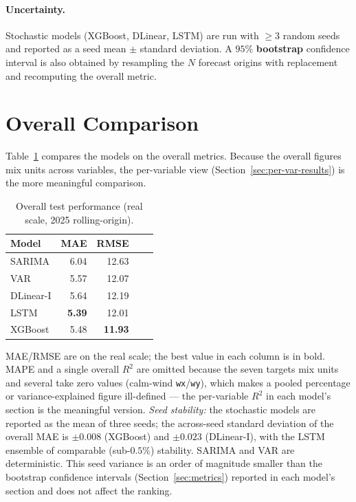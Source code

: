 \documentclass[12pt,a4paper,oneside]{report}
\begin{document}
\paragraph{Uncertainty.}
Stochastic models (XGBoost, DLinear, LSTM) are run with $\ge 3$ random seeds and
reported as a seed mean $\pm$ standard deviation. A $95\%$ \textbf{bootstrap}
confidence interval is also obtained by resampling the $N$ forecast origins with
replacement and recomputing the overall metric.

\section{Overall Comparison}
Table~\ref{tab:overall} compares the models on the overall metrics. Because the
overall figures mix units across variables, the per-variable view
(Section~\ref{sec:per-var-results}) is the more meaningful comparison.

\begin{table}[H]
\centering
\caption{Overall test performance (real scale, 2025 rolling-origin).}
\label{tab:overall}
\begin{tabular}{lrrrr}
\toprule
\textbf{Model} & \textbf{MAE} & \textbf{RMSE} \\
\midrule
SARIMA      & 6.04 & 12.63 \\
VAR         & 5.57 & 12.07 \\
DLinear-I   & 5.64 & 12.19 \\
LSTM        & \textbf{5.39} & 12.01 \\
XGBoost     & 5.48 & \textbf{11.93} \\
\bottomrule
\end{tabular}
\end{table}

\noindent\footnotesize MAE/RMSE are on the real scale; the best value in each
column is in bold. MAPE and a single overall $R^2$ are omitted because the seven
targets mix units and several take zero values (calm-wind \texttt{wx}/\texttt{wy}),
which makes a pooled percentage or variance-explained figure ill-defined --- the
per-variable $R^2$ in each model's section is the meaningful version.
\emph{Seed stability:} the stochastic models are reported as the mean of three
seeds; the across-seed standard deviation of the overall MAE is $\pm0.008$
(XGBoost) and $\pm0.023$ (DLinear-I), with the LSTM ensemble of comparable
(sub-$0.5\%$) stability. SARIMA and VAR are deterministic. This seed variance is an
order of magnitude smaller than the bootstrap confidence intervals
(Section~\ref{sec:metrics}) reported in each model's section and does not affect
the ranking.\normalsize
\end{document}
